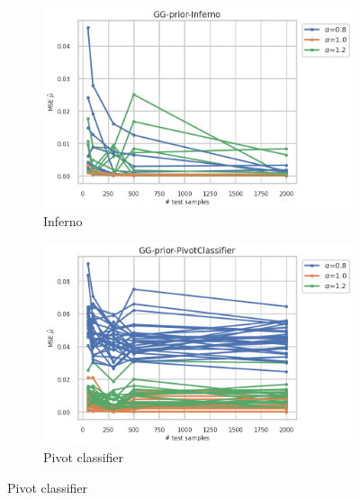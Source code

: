\begin{figure}[ht!]
  \begin{subfigure}[t]{0.49\linewidth}
    \includegraphics[width=\linewidth]{COMPARE/GG-prior/Inferno/profusion_n_samples_mse.png}
    \caption{Inferno}
  \end{subfigure}%
  \hfill
  \begin{subfigure}[t]{0.49\linewidth}
    \includegraphics[width=\linewidth]{COMPARE/GG-prior/PivotClassifier/profusion_n_samples_mse.png}
    \caption{Pivot classifier}
  \end{subfigure}


\end{figure}
